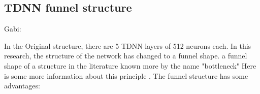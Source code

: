 \documentclass[a4paper]{article}
\begin{document}





\subsection{TDNN funnel structure}

Gabi:

In the Original structure, there are 5 TDNN layers of 512 neurons each. In this research, the structure of the network has changed to a funnel shape. a funnel shape of a structure in the literature known more by the name "bottleneck" Here is some more information about this principle \cite{tishby2015deep}.
The funnel structure has some advantages:
\end{document}
